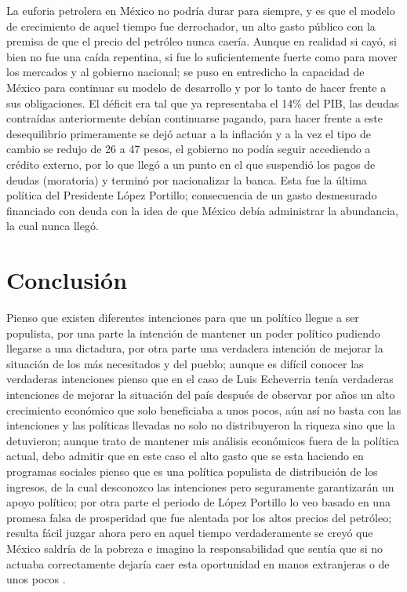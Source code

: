 La euforia petrolera en México no podría durar para siempre, y es que el modelo de crecimiento de aquel tiempo fue derrochador, un alto gasto público con la premisa de que el precio del petróleo nunca caería. Aunque en realidad si cayó, si bien no fue una caída repentina, si fue lo suficientemente fuerte como para mover los mercados y al gobierno nacional; se puso en entredicho la capacidad de México para continuar su modelo de desarrollo y por lo tanto de hacer frente a sus obligaciones. El déficit era tal que ya representaba el 14\% del PIB, las deudas contraídas anteriormente debían continuarse pagando, para hacer frente a este desequilibrio primeramente se dejó actuar a la inflación y a la vez el tipo de cambio se redujo de 26 a 47 pesos, el gobierno no podía seguir accediendo a crédito externo, por lo que llegó a un punto en el que suspendió los pagos de deudas (moratoria) y terminó por nacionalizar la banca. Esta fue la última política del Presidente López Portillo; consecuencia de un gasto desmesurado financiado con deuda con la idea de que México debía administrar la abundancia, la cual nunca llegó.

\section{Conclusión}
Pienso que existen diferentes intenciones para que un político llegue a ser populista, por una parte la intención de mantener un poder político pudiendo llegarse a una dictadura, por otra parte una verdadera intención de mejorar la situación de los más necesitados y del pueblo; aunque es difícil conocer las verdaderas intenciones pienso que en el caso de Luis Echeverria tenía verdaderas intenciones de mejorar la situación del país después de observar por años un alto crecimiento económico que solo beneficiaba a unos pocos, aún así no basta con las intenciones y las políticas llevadas no solo no distribuyeron la riqueza sino que la detuvieron; aunque trato de mantener mis análisis económicos fuera de la política actual, debo admitir que en este caso el alto gasto que se esta haciendo en programas sociales pienso que es una política populista de distribución de los ingresos, de la cual desconozco las intenciones pero seguramente garantizarán un apoyo político; por otra parte el periodo de López Portillo lo veo basado en una promesa falsa de prosperidad que fue alentada por los altos precios del petróleo; resulta fácil juzgar ahora pero en aquel tiempo verdaderamente se creyó que México saldría de la pobreza e imagino la responsabilidad que sentía que si no actuaba correctamente dejaría caer esta oportunidad en manos extranjeras o de unos pocos \cite{PopulismoMexicano}.